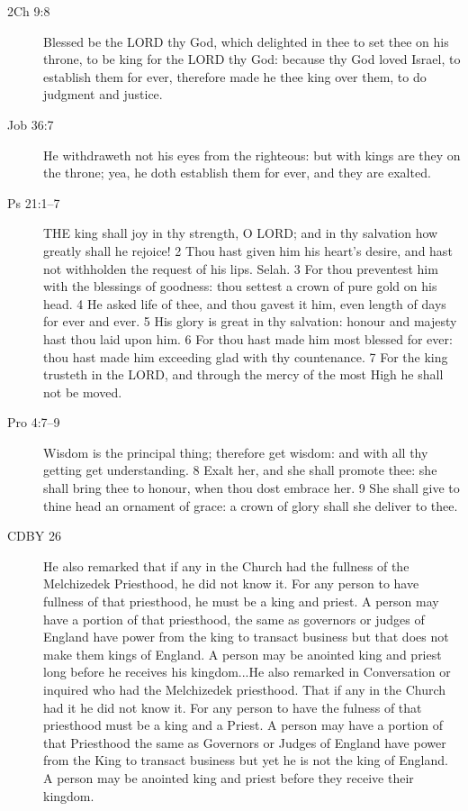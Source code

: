\begin{description}
		\item[2Ch 9:8] Blessed be the LORD thy God, which delighted in thee to set thee on his throne, to be king for the LORD thy God: because thy God loved Israel, to establish them for ever, therefore made he thee king over them, to do judgment and justice.
		\item[Job 36:7] He withdraweth not his eyes from the righteous: but with kings are they on the throne; yea, he doth establish them for ever, and they are exalted.
		\item[Ps 21:1--7] THE king shall joy in thy strength, O LORD; and in thy salvation how greatly shall he rejoice! 2 Thou hast given him his heart's desire, and hast not withholden the request of his lips. Selah. 3 For thou preventest him with the blessings of goodness: thou settest a crown of pure gold on his head. 4 He asked life of thee, and thou gavest it him, even length of days for ever and ever. 5 His glory is great in thy salvation: honour and majesty hast thou laid upon him. 6 For thou hast made him most blessed for ever: thou hast made him exceeding glad with thy countenance. 7 For the king trusteth in the LORD, and through the mercy of the most High he shall not be moved.
		\item[Pro 4:7--9] Wisdom is the principal thing; therefore get wisdom: and with all thy getting get understanding. 8 Exalt her, and she shall promote thee: she shall bring thee to honour, when thou dost embrace her. 9 She shall give to thine head an ornament of grace: a crown of glory shall she deliver to thee.
		\item[CDBY 26] He also remarked that if any in the Church had the fullness of the Melchizedek Priesthood, he did not know it. For any person to have fullness of that priesthood, he must be a king and priest. A person may have a portion of that priesthood, the same as governors or judges of England have power from the king to transact business but that does not make them kings of England. A person may be anointed king and priest long before he receives his kingdom...He also remarked in Conversation or inquired who had the Melchizedek priesthood. That if any in the Church had it he did not know it. For any person to have the fulness of that priesthood must be a king and a Priest. A person may have a portion of that Priesthood the same as Governors or Judges of England have power from the King to transact business but yet he is not the king of England. A person may be anointed king and priest before they receive their kingdom.

\end{description}
